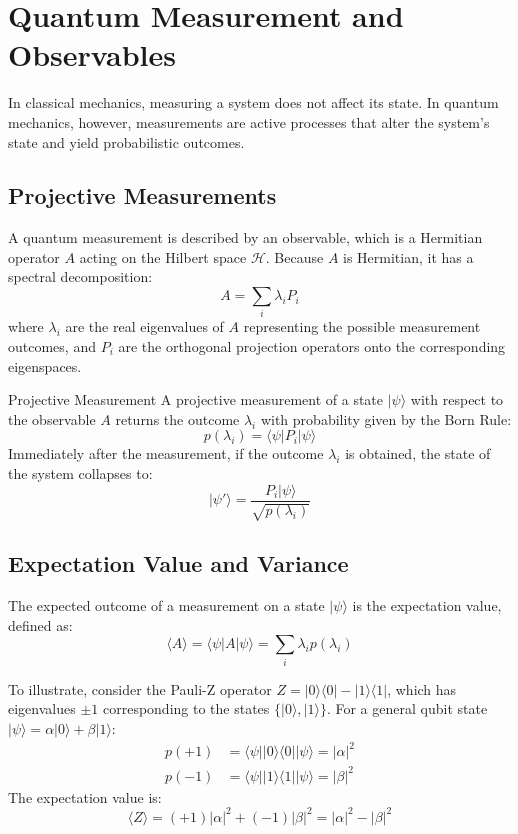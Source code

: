 \chapter{Quantum Measurement and Observables}

In classical mechanics, measuring a system does not affect its state. In quantum mechanics, however, measurements are active processes that alter the system's state and yield probabilistic outcomes.

\section{Projective Measurements}

A quantum measurement is described by an observable, which is a Hermitian operator \(A\) acting on the Hilbert space \(\mathcal{H}\). Because \(A\) is Hermitian, it has a spectral decomposition:
\[
A = \sum_{i} \lambda_i P_i
\]
where \(\lambda_i\) are the real eigenvalues of \(A\) representing the possible measurement outcomes, and \(P_i\) are the orthogonal projection operators onto the corresponding eigenspaces.

\begin{definitionbox}{Projective Measurement}
A projective measurement of a state \(|\psi\rangle\) with respect to the observable \(A\) returns the outcome \(\lambda_i\) with probability given by the Born Rule:
\[
p(\lambda_i) = \langle\psi| P_i |\psi\rangle
\]
Immediately after the measurement, if the outcome \(\lambda_i\) is obtained, the state of the system collapses to:
\[
|\psi'\rangle = \frac{P_i |\psi\rangle}{\sqrt{p(\lambda_i)}}
\]
\end{definitionbox}

\section{Expectation Value and Variance}

The expected outcome of a measurement on a state \(|\psi\rangle\) is the expectation value, defined as:
\[
\langle A \rangle = \langle\psi| A |\psi\rangle = \sum_i \lambda_i p(\lambda_i)
\]

To illustrate, consider the Pauli-Z operator \(Z = |0\rangle\langle0| - |1\rangle\langle1|\), which has eigenvalues \(\pm 1\) corresponding to the states \(\{|0\rangle, |1\rangle\}\).
For a general qubit state \(|\psi\rangle = \alpha|0\rangle + \beta|1\rangle\):
\begin{align*}
p(+1) &= \langle\psi| |0\rangle\langle0| |\psi\rangle = |\alpha|^2 \\
p(-1) &= \langle\psi| |1\rangle\langle1| |\psi\rangle = |\beta|^2
\end{align*}
The expectation value is:
\[
\langle Z \rangle = (+1)|\alpha|^2 + (-1)|\beta|^2 = |\alpha|^2 - |\beta|^2
\]

